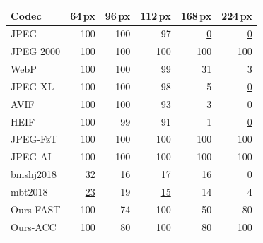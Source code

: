 \begin{tabular}{lrrrrr}
\toprule
Codec & 64\,px & 96\,px & 112\,px & 168\,px & 224\,px \\
\midrule
JPEG & 100 & 100 & 97 & \cellcolor{red!22}\underline{0} & \cellcolor{red!22}\underline{0} \\
JPEG 2000 & 100 & 100 & 100 & 100 & 100 \\
WebP & 100 & 100 & 99 & 31 & 3 \\
JPEG XL & 100 & 100 & 98 & 5 & \cellcolor{red!22}\underline{0} \\
AVIF & 100 & 100 & 93 & 3 & \cellcolor{red!22}\underline{0} \\
HEIF & 100 & 99 & 91 & 1 & \cellcolor{red!22}\underline{0} \\
JPEG-FzT & 100 & 100 & 100 & 100 & 100 \\
JPEG-AI & 100 & 100 & 100 & 100 & 100 \\
bmshj2018 & 32 & \cellcolor{red!22}\underline{16} & 17 & 16 & \cellcolor{red!22}\underline{0} \\
mbt2018 & \cellcolor{red!22}\underline{23} & 19 & \cellcolor{red!22}\underline{15} & 14 & 4 \\
Ours-FAST & 100 & 74 & 100 & 50 & 80 \\
Ours-ACC & 100 & 80 & 100 & 80 & 100 \\
\bottomrule
\end{tabular}
